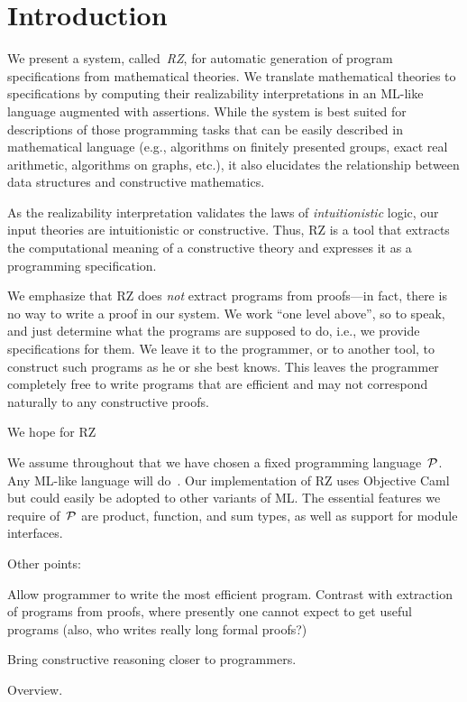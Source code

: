 \section{Introduction}
\label{sec:introduction}

We present a system, called~\emph{RZ}, for automatic generation of
program specifications from mathematical theories. We translate
mathematical theories to specifications by computing their
realizability interpretations in an ML-like language augmented with
assertions. While the system is best suited for descriptions of those
programming tasks that can be easily described in mathematical
language (e.g., algorithms on finitely presented groups, exact real
arithmetic, algorithms on graphs, etc.), it also elucidates the
relationship between data structures and constructive mathematics.

As the realizability interpretation validates the laws of
\emph{intuitionistic} logic, our input theories are intuitionistic or
constructive. Thus, RZ is a tool that extracts the computational
meaning of a constructive theory and expresses it as a programming
specification.

We emphasize that RZ does \emph{not} extract programs from proofs---in
fact, there is no way to write a proof in our system. We work ``one
level above'', so to speak, and just determine what the programs are
supposed to do, i.e., we provide specifications for them. We leave it
to the programmer, or to another tool, to construct such programs as
he or she best knows. This leaves the programmer completely free to
write programs that are efficient and may not correspond naturally to
any constructive proofs.

We hope for RZ 


We assume throughout that we have chosen a fixed programming
language~$\mathcal{P}$. Any ML-like language will
do~\cite{milner+:definition}. Our implementation of RZ uses Objective
Caml~\cite{ocaml} but could easily be adopted to other variants of ML.
The essential features we require of~$\mathcal{P}$ are product, function, and
sum types, as well as support for module interfaces.

Other points:

Allow programmer to write the most efficient program. Contrast with
extraction of programs from proofs, where presently one cannot expect
to get useful programs (also, who writes really long formal proofs?)

Bring constructive reasoning closer to programmers.

Overview.

